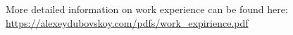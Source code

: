 
\begin{cvparagraph}

  More detailed information on work experience can be found here: \url{https://alexeydubovskoy.com/pdfs/work_expirience.pdf}

\end{cvparagraph}
